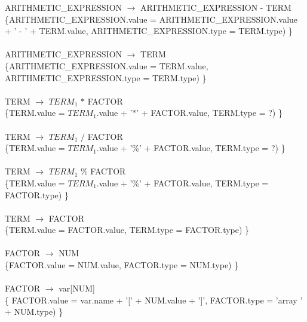 \documentclass[10pt,a4paper]{article}
\begin{document}
{{{ARITHMETIC\_EXPRESSION $\rightarrow$ ARITHMETIC\_EXPRESSION - TERM  \\

\{ARITHMETIC\_EXPRESSION.value =  ARITHMETIC\_EXPRESSION.value + ' - ' + TERM.value, ARITHMETIC\_EXPRESSION.type = TERM.type) \}  \\ \\


ARITHMETIC\_EXPRESSION $\rightarrow$ TERM \\

\{ARITHMETIC\_EXPRESSION.value = TERM.value, ARITHMETIC\_EXPRESSION.type = TERM.type) \}  \\ \\


TERM $\rightarrow$ $TERM_{1}$ $*$ FACTOR   \\

\{TERM.value = $TERM_{1}$.value + '$*$' + FACTOR.value, TERM.type = ?) \}  \\ \\


TERM $\rightarrow$ $TERM_{1}$ $/$ FACTOR   \\

\{TERM.value = $TERM_{1}$.value + '\%' + FACTOR.value, TERM.type = ?) \}  \\ \\


TERM $\rightarrow$ $TERM_{1}$ \% FACTOR  \\

\{TERM.value = $TERM_{1}$.value + '\%' + FACTOR.value, TERM.type = FACTOR.type) \}  \\ \\


TERM $\rightarrow$ FACTOR \\

\{TERM.value = FACTOR.value, TERM.type = FACTOR.type) \}  \\ \\


FACTOR $\rightarrow$ NUM   \\

\{FACTOR.value = NUM.value, FACTOR.type = NUM.type) \}  \\ \\


FACTOR $\rightarrow$ var[NUM]  \\ 

\{ FACTOR.value = var.name + '[' + NUM.value + ']', FACTOR.type = 'array ' + NUM.type) \}  \\ 
\\

}}}
\end{document}
